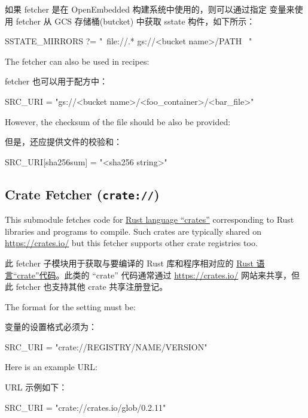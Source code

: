 如果 fetcher 是在 OpenEmbedded 构建系统中使用的，则可以通过指定  变量来使用 fetcher 从 GCS 存储桶(butcket) 中获取 sstate 构件，如下所示：

\begin{pyglist}
SSTATE_MIRRORS ?= "\
    file://.* gs://<bucket name>/PATH \
"
\end{pyglist}

The fetcher can also be used in recipes:

fetcher 也可以用于配方中：

\begin{pyglist}
SRC_URI = "gs://<bucket name>/<foo_container>/<bar_file>"
\end{pyglist}

However, the checksum of the file should be also be provided:

但是，还应提供文件的校验和：

\begin{pyglist}
SRC_URI[sha256sum] = "<sha256 string>"
\end{pyglist}

\subsection{Crate Fetcher (\texttt{crate://})}

This submodule fetches code for \href{https://doc.rust-lang.org/reference/glossary.html?highlight=crate#crate}{Rust language ``crates''} corresponding to Rust libraries and programs to compile. Such crates are typically shared on \url{https://crates.io/} but this fetcher supports other crate registries too.

此 fetcher 子模块用于获取与要编译的 Rust 库和程序相对应的 \href{https://doc.rust-lang.org/reference/glossary.html?highlight=crate#crate}{Rust 语言“crate”代码}。此类的 ``crate'' 代码通常通过 \url{https://crates.io/} 网站来共享，但此 fetcher 也支持其他 crate 共享注册登记。

The format for the  setting must be:

\bbgls{SRC_URI} 变量的设置格式必须为：

\begin{pyglist}
SRC_URI = "crate://REGISTRY/NAME/VERSION"
\end{pyglist}

Here is an example URL:

URL 示例如下：

\begin{pyglist}
SRC_URI = "crate://crates.io/glob/0.2.11"
\end{pyglist}

